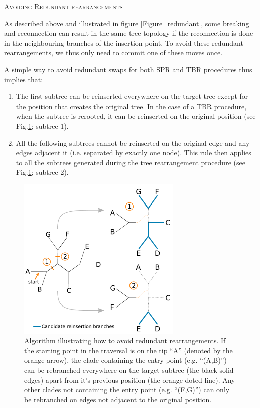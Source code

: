 \documentclass[12pt,letterpaper]{article}
\renewcommand{\section}[1]{%
\bigskip
\begin{center}
\begin{Large}
\normalfont\scshape #1
\medskip
\end{Large}
\end{center}}
\begin{document}
\section{Avoiding Redundant rearrangements}
As described above and illustrated in figure \ref{Figure_redundant}, some breaking and reconnection can result in the same tree topology if the reconnection is done in the neighbouring branches of the insertion point.
To avoid these redundant rearrangements, we thus only need to commit one of these moves once.

A simple way to avoid redundant swaps for both SPR and TBR procedures thus implies that:
\begin{enumerate}
    \item The first subtree can be reinserted everywhere on the target tree except for the position that creates the original tree. In the case of a TBR procedure, when the subtree is rerooted, it can be reinserted on the original position (see Fig.\ref{Figure_Neighbor}; subtree 1).
    \item All the following subtrees cannot be reinserted on the original edge and any edges adjacent it (i.e. separated by exactly one node). This rule then applies to all the subtrees generated during the tree rearrangement procedure (see Fig.\ref{Figure_Neighbor}; subtree 2).
\end{enumerate}

\begin{figure}[!htbp]
\centering
   \includegraphics[width=0.7\textwidth]{Figure/Figure_Neighbour.pdf}
\caption{Algorithm illustrating how to avoid redundant rearrangements. If the starting point in the traversal is on the tip ``A'' (denoted by the orange arrow), the clade containing the entry point (e.g. ``(A,B)'') can be rebranched everywhere on the target subtree (the black solid edges) apart from it's previous position (the orange doted line). Any other clades not containing the entry point (e.g. ``(F,G)'') can only be rebranched on edges not adjacent to the original position.}
\label{Figure_Neighbor}
\end{figure}
\end{document}
